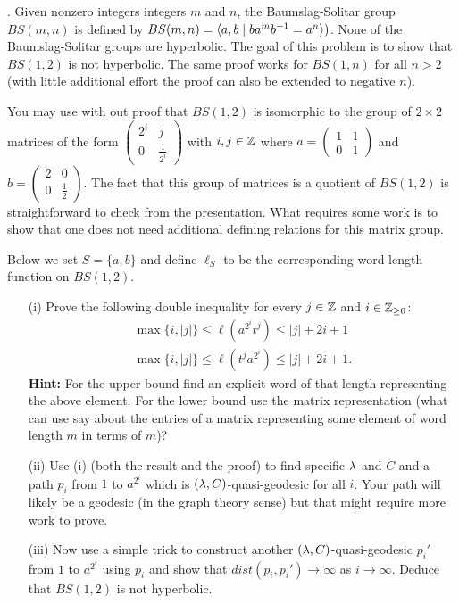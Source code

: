 \documentclass[12pt]{amsart}
\begin{document}
. Given nonzero integers integers $m$ and $n$, the Baumslag-Solitar group $BS(m,n)$ is defined by $BS(m,n)={\langle} a,b \mid ba^m b^{-1}=a^n{\rangle})$.
None of the Baumslag-Solitar groups are hyperbolic. The goal of this problem is to show that $BS(1,2)$ is not hyperbolic. The same proof
works for $BS(1,n)$ for all $n>2$ (with little additional effort the proof can also be extended to negative $n$).

You may use with out proof that $BS(1,2)$ is isomorphic to the group of $2\times 2$ matrices of the form 
$\begin{pmatrix}2^i & j \\ 0 & \frac{1}{2^i} \end{pmatrix}$ with $i,j\in{\mathbb Z}$ where $a=\begin{pmatrix}1 & 1 \\ 0 & 1 \end{pmatrix}$
and $b=\begin{pmatrix}2 & 0 \\ 0 & \frac{1}{2} \end{pmatrix}$. The fact that this group of matrices is a quotient of $BS(1,2)$ is straightforward
to check from the presentation. What requires some work is to show that one does not need additional defining relations for this matrix group.

Below we set $S=\{a,b\}$ and define $\ell_S$ to be the corresponding word length function on $BS(1,2)$.

\begin{itemize}
\item[(i)] Prove the following double inequality for every $j\in{\mathbb Z}$ and $i\in {\mathbb Z}_{\geq 0}$:
\begin{gather}
\max\{i,|j|\}\leq \ell(a^{2^i} t^j)\leq |j|+2i+1\\
\max\{i,|j|\}\leq \ell(t^j a^{2^i})\leq |j|+2i+1.
\end{gather}
{\bf Hint:} For the upper bound find an explicit word of that length representing the above element. For the lower bound use the matrix representation (what can use say about the entries of a matrix representing some element of word length $m$ in terms of $m$)?

\item[(ii)] Use (i) (both the result and the proof) to find specific ${\lambda}$ and $C$ and a path $p_i$ from $1$ to $a^{2^i}$
which is $({\lambda},C)$-quasi-geodesic for all $i$. Your path will likely be a geodesic (in the graph theory sense) but
that might require more work to prove.

\item[(iii)] Now use a simple trick to construct another  $({\lambda},C)$-quasi-geodesic $p_i'$ from $1$ to $a^{2^i}$ using $p_i$
and show that $dist(p_i,p_i')\to \infty$ as $i\to \infty$. Deduce that $BS(1,2)$ is not hyperbolic.

\end{itemize}
\end{document}
